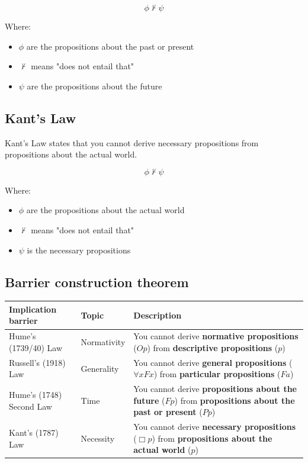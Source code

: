 \documentclass[11pt]{article}
\begin{document}
\[\phi \nvdash \psi\]

Where:
\begin{itemize}
\item \(\phi\) are the propositions about the past or present
\item \(\nvdash\) means "does not entail that"
\item \(\psi\) are the propositions about the future
\end{itemize}

 \newpage
\subsection{Kant's Law}
\label{sec:org9763b94}
Kant's Law states that you cannot derive necessary propositions from propositions about the actual world.

\[\phi \nvdash \psi\]

Where:
\begin{itemize}
\item \(\phi\) are the propositions about the actual world
\item \(\nvdash\) means "does not entail that"
\item \(\psi\) is the necessary propositions
\end{itemize}
\subsection{Barrier construction theorem}
\label{sec:orgadd8fef}
\begin{center}
\begin{tabularx}{\textwidth}{|X|X|X|}
\hline
Implication barrier & Topic & Description\\
\hline
Hume's (1739/40) Law & Normativity & You cannot derive \textbf{normative propositions} (\(Op\)) from \textbf{descriptive propositions} (\(p\))\\
\hline
Russell's (1918) Law & Generality & You cannot derive \textbf{general propositions} (\(\forall x F x\)) from \textbf{particular propositions} (\(Fa\))\\
\hline
Hume's (1748) Second Law & Time & You cannot derive \textbf{propositions about the future} (\(Fp\)) from \textbf{propositions about the past or present} (\(Pp\))\\
\hline
Kant's (1787) Law & Necessity & You cannot derive \textbf{necessary propositions} (\(\Box p\)) from \textbf{propositions about the actual world} (\(p\))\\
\hline
\end{tabularx}
\end{center}
\end{document}
